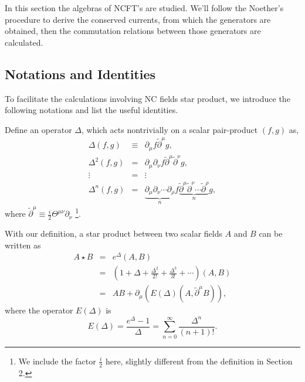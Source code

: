 \documentclass[a4paper,a4paper]{article}
\begin{document}
In this section the algebras of NCFT's are studied. 
We'll follow the Noether's procedure to derive the conserved currents, from
which the generators are obtained, then the commutation relations between 
those generators are calculated. 

\subsection{Notations and Identities}

To facilitate the calculations involving NC fields star product, we introduce 
the following notations and list the useful identities.

Define an operator $\Delta$, which acts nontrivially on a scalar pair-product $(f,g)$ as, 
\begin{eqnarray}
\Delta(f,g) &\equiv& {\partial}_\mu f\tilde{\partial}^\mu g, \nonumber\\
\Delta^2(f,g) &=& \partial_\mu\partial_\nu f
\tilde{\partial}^\mu\tilde{\partial}^\nu g, \nonumber\\
\vdots & = & \vdots \nonumber\\
\Delta^n(f,g) &=& \underbrace{\partial_\mu\partial_\nu\cdots \partial_\rho}_n f
\underbrace{\tilde{\partial}^\mu\tilde{\partial}^\nu\cdots \tilde{\partial}^\rho}_n g,
\end{eqnarray}
where $\tilde{\partial}^\mu \equiv \frac i2\Theta^{\mu\nu}\partial_\nu$
\footnote{We include the factor $\frac i2$ here, slightly different from the definition 
in Section 2.}. 

With our definition, a star product between two scalar fields $A$ and $B$ can be written as
\begin{eqnarray}
A\star B & = & e^\Delta(A,B) \nonumber\\
& = & \left(1+\Delta+\frac{\Delta^2}{2!}+\frac{\Delta^3}{3!}+\cdots\right)(A,B)\nonumber\\
& = & AB + \partial_\mu\left(E(\Delta)(A,\tilde{\partial}^\mu B)\right),
\end{eqnarray}
where the operator $E(\Delta)$ is
\begin{equation}
E(\Delta) = \frac{e^\Delta-1}{\Delta} = \sum_{n=0}^{\infty}\frac{\Delta^n}{(n+1)!}.
\end{equation}
\end{document}

